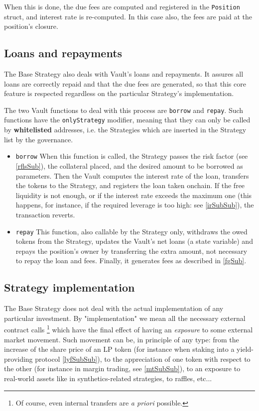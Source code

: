 \documentclass[a4paper,10 pt]{article}
\theoremstyle{definition}
\begin{document}
When this is done, the due fees are computed and registered in the \verb|Position| struct, and interest rate is re-computed. In this case also, the fees are paid at the position's closure.

\subsection{Loans and repayments}\label{lrSub}

The Base Strategy also deals with Vault's loans and repayments. It assures all loans are correctly repaid and that the due fees are generated, so that this core feature is respected regardless on the particular Strategy's implementation.

The two Vault functions to deal with this process are \verb|borrow| and \verb|repay|. Such functions have the \verb|onlyStrategy| modifier, meaning that they can only be called by {\bf whitelisted} addresses, i.e. the Strategies which are inserted in the Strategy list by the governance.

\begin{itemize}
\item \verb|borrow| When this function is called, the Strategy passes the risk factor (see \ref{rflsSub}), the collateral placed, and the desired amount to be borrowed as parameters. Then the Vault computes the interest rate of the loan, transfers the tokens to the Strategy, and registers the loan taken onchain. If the free liquidity is not enough, or if the interest rate exceeds the maximum one (this happens, for instance, if the required leverage is too high: see \ref{irSubSub}), the transaction reverts.
\item \verb|repay| This function, also callable by the Strategy only, withdraws the owed tokens from the Strategy, updates the Vault's net loans (a state variable) and repays the position's owner by transferring the extra amount, not necessary to repay the loan and fees. Finally, it generates fees as described in \ref{fgSub}.
\end{itemize}

\subsection{Strategy implementation}\label{siSub}
The Base Strategy does not deal with the actual implementation of any particular investment. By "implementation" we mean all the necessary external contract calls \footnote{Of course, even internal transfers are {\it a priori} possible.} which have the final effect of having an {\it exposure} to some external market movement. Such movement can be, in principle of any type: from the increase of the share price of an LP token (for instance when staking into a yield-providing protocol \ref{lyfSubSub}), to the appreciation of one token with respect to the other (for instance in margin trading, see \ref{mtSubSub}), to an exposure to real-world assets like in synthetics-related strategies, to raffles, etc...
\end{document}
